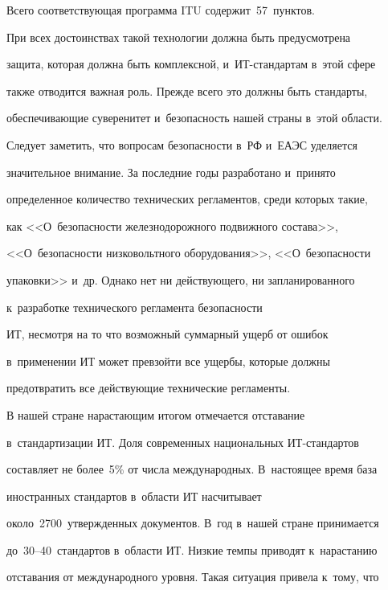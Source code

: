       


      Всего соответствующая программа ITU содержит~57~пунктов.


      


      При всех достоинствах такой технологии должна быть предусмотрена 


защита, которая должна быть комплексной, и~ИТ-стан\-дар\-там в~этой сфере 


также отводится важная роль. Прежде всего это должны быть стандарты, 


обеспечивающие суверенитет и~безопасность нашей страны в~этой области. 


Следует заметить, что вопросам безопасности в~РФ и~ЕАЭС уделяется 


значительное внимание. За последние годы разработано и~принято 


определенное количество технических регламентов, среди которых такие, 


как <<О~безопасности железнодорожного подвижного состава>>, 


<<О~безопасности низковольтного обору\-до\-ва\-ния>>, <<О~безопасности 


упаковки>> и~др. Однако нет ни действующего, ни запланированного 


к~разработке технического регламента безопасности 


ИТ, несмотря на то что возможный суммарный ущерб от ошибок 


в~применении ИТ может прев\-зойти все ущербы, которые должны 


предотвратить все действующие технические регламенты. 


      


      В нашей стране нарастающим итогом отмечается отставание 


в~стандартизации ИТ. Доля современных национальных ИТ-стан\-дар\-тов 


составляет не более~5\% от числа международных. В~настоящее время база 


иностранных стандартов в~области ИТ насчитывает 


около~2700~утвержденных документов. В~год в~нашей стране принимается 


до~30--40~стандартов в~области ИТ. Низкие темпы приводят к~нарастанию 


отставания от международного уровня. Такая ситуация привела к~тому, что 


